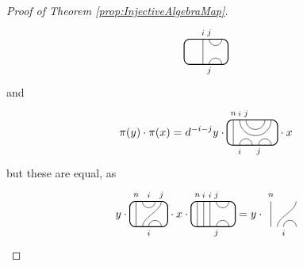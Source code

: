 \documentclass[11pt]{article}
\theoremstyle{plain}
\theoremstyle{definition}
\newcommand{\TLPlusPIso}[3]{
 \TLTStart
 \TLTThrough{#1}
 \TLTSnakeR{#2}{#3}
 \TLTEnd
}
\newcommand{\TLCapJoin}[5]{
 \TLTStart
 \TLTThrough{#1}
 \TLTCapJoin{#2}{#3}{#4}{#5}
 \TLTEnd
}
\newcommand{\TLTCalcLabelOffset}[3][0cm]{
 \settowidth{#2}{\scriptsize{$#3$}}
 \setlength{#2}{.5#2}
 \setlength{#2}{\maxof{#2}{#1}}
}
\newcommand{\TLTEnd}{
 \draw[thick, rounded corners = 5pt] (0,0) rectangle ($ (TLTlead) + (0,.8) $);
 \end{tikzpicture}
}
\newcommand{\TLTStart}{
 \begin{tikzpicture}[baseline=.3cm]
 \coordinate (TLTlead) at (.2,0); %
 \let\TLTlabelwidth\relax
 \newlength{\TLTlabelwidth}
}
\newcommand{\TLTThrough}[1]{
 \TLTCalcLabelOffset[.2cm]{\TLTlabelwidth}{#1}
 \coordinate (TLTlead) at ($ (TLTlead) + ({\TLTlabelwidth},0) $);
 \begin{scope}[shift=(TLTlead)]
  \draw (0,0) -- (0,.8);
  \node at (0,1) {\scriptsize{$#1$}};
 \end{scope}
  \coordinate (TLTlead) at ($ (TLTlead) + ({\TLTlabelwidth},0) $);
}
\newcommand{\TLTCapcup}[1]{
 \TLTCalcLabelOffset[.2cm]{\TLTlabelwidth}{#1}
  \coordinate (TLTlead) at ($ (TLTlead) + ({\TLTlabelwidth},0) $);
 \begin{scope}[shift=(TLTlead)]
  \draw (0,0) arc (180:0:.2);
  \draw (0,.8) arc (-180:0:.2);
  \node at (0,1) {\scriptsize{$#1$}};
 \end{scope}
 \TLTCalcLabelOffset[.5cm]{\TLTlabelwidth}{#1}
 \coordinate (TLTlead) at ($ (TLTlead) + ({\TLTlabelwidth},0)$);
}
\newcommand{\TLTSnakeR}[2]{
 \let\TLTscwidth\relax
 \newlength{\TLTscwidth}
 \let\TLTsswidth\relax
 \newlength{\TLTsswidth}
 \TLTCalcLabelOffset[.2cm]{\TLTscwidth}{#1}
 \TLTCalcLabelOffset[.5cm]{\TLTsswidth}{#2}
 \setlength{\TLTlabelwidth}{\TLTscwidth+\TLTsswidth}
 \setlength{\TLTlabelwidth}{\maxof{\TLTlabelwidth}{.7cm}} %
 \coordinate (TLTlead) at ($ (TLTlead) + ({\TLTscwidth},0) $);
 \begin{scope}[shift=(TLTlead)]
  \draw (.1,.8) arc (-180:0:.2cm);
  \draw (.1,0) .. controls ++(90:.3cm) and ++(270:.3cm) .. ($ (.1,.8) + ({\TLTlabelwidth},0) $);
  \draw ($ (.1,0) + ({\TLTsswidth},0) $) arc (180:0:.2cm);
  \node at (.1,1) {\scriptsize{$#1$}};
  \node at ($ (.1,1) + ({\TLTlabelwidth},0) $) {\scriptsize{$#2$}};
  \node at ($ (.1,-.2) + ({\TLTsswidth},0) $) {\scriptsize{$#1$}};
 \end{scope}
 \coordinate (TLTlead) at ($ (TLTlead) + ({\TLTlabelwidth+\TLTsswidth},0) $);
}
\newcommand{\TLTCapJoin}[4]{
 \let\TLTjoinlwidth\relax
 \newlength{\TLTjoinlwidth}
 \let\TLTjoinrwidth\relax
 \newlength{\TLTjoinrwidth}
 \let\TLTsplitlwidth\relax
 \newlength{\TLTsplitlwidth}
 \let\TLTsplitrwidth\relax
 \newlength{\TLTsplitrwidth}
 \TLTCalcLabelOffset[.8cm]{\TLTjoinrwidth}{#4} %
 \TLTCalcLabelOffset[.15cm]{\TLTjoinlwidth}{#3} %
 \TLTCalcLabelOffset[.6cm]{\TLTsplitlwidth}{#1}
 \TLTCalcLabelOffset[.6cm]{\TLTsplitrwidth}{#2}
 \setlength{\TLTlabelwidth}{\maxof{\TLTjoinlwidth}{\TLTsplitlwidth}}
 \coordinate (TLTlead) at ($ (TLTlead) + ({\TLTlabelwidth},0) $);
 \setlength{\TLTlabelwidth}{\maxof{\TLTjoinrwidth}{\TLTsplitrwidth}} %
 \begin{scope}[shift=(TLTlead)]
  \draw (0,.8) arc (-180:0:.5);
  \draw (0.2,.8) arc (-180:0:.3);
  \draw (0,0) arc (180:0:.2);
  \draw ({\TLTsplitlwidth},0) arc (180:0:.2);
  \node at (0,1) {\scriptsize{$#4$}};
  \node at ({\TLTjoinlwidth},1) {\scriptsize{$#3$}};
  \node at (0,-.2) {\scriptsize{$#1$}};
  \node at ({\TLTsplitlwidth},-.2) {\scriptsize{$#2$}};
 \end{scope}
 \coordinate (TLTlead) at ($ (TLTlead) + ({\TLTlabelwidth},0) $);
}
\begin{document}
\begin{proof}[Proof of Theorem \ref{prop:InjectiveAlgebraMap}]
$$\begin{tikzpicture}[baseline=.3cm]
  \draw (.6,0) -- (.6,.8);
  \node at (.6,1) {\scriptsize{$i$}};
  \draw (.8,0) arc (180:0:.2cm);
  \node at (.8,-.2) {\scriptsize{$j$}};
  \draw (.8,.8) arc (-180:0:.2cm);
  \node at (.8,1) {\scriptsize{$j$}};
  \draw[thick, rounded corners = 5pt] (0,0) rectangle (1.4,.8);
 \end{tikzpicture}
$$
and
$$
\pi(y)\cdot \pi(x) = d^{-i-j}y\cdot
 \begin{tikzpicture}[baseline=.3cm]
  \draw (.2,0) -- (.2,.8);
  \node at (.2,1) {\scriptsize{$n$}};
  \draw (.4,0) arc (180:0:.2cm);
  \node at (.4,-.2) {\scriptsize{$i$}};
  \draw (1,0) arc (180:0:.2cm);
  \node at (1,-.2) {\scriptsize{$j$}};
  \draw (.4,.8) arc (-180:0:.5cm);
  \node at (.4,1) {\scriptsize{$i$}};
  \draw (.6,.8) arc (-180:0:.3cm);
  \node at (.6,1) {\scriptsize{$j$}};
  \draw[thick, rounded corners = 5pt] (0,0) rectangle (1.6,.8);
 \end{tikzpicture}
\cdot x
$$
but these are equal, as
\begin{equation*}
 y\cdot
 \begin{tikzpicture}[baseline=.3cm]
  \draw (.2,0) -- (.2,.8);
  \node at (.2,1) {\scriptsize{$n$}};
  \draw (.6,0) arc (180:0:.2cm);
  \node at (.6,-.2) {\scriptsize{$i$}};
  \draw (.4,0) .. controls ++(90:.3cm) and ++(270:.3cm) .. (1,.8);
  \node at (1,1) {\scriptsize{$j$}};
  \draw (.4,.8) arc (-180:0:.2cm);
  \node at (.6,1) {\scriptsize{$i$}};
  \draw[thick, rounded corners = 5pt] (0,0) rectangle (1.2,.8);
 \end{tikzpicture}
\cdot x \cdot
 \begin{tikzpicture}[baseline=.3cm]
  \draw (.2,0) -- (.2,.8);
  \node at (.2,1) {\scriptsize{$n$}};
  \draw (.4,0) -- (.4,.8);
  \node at (.4,1) {\scriptsize{$i$}};
  \draw (.6,0) -- (.6,.8);
  \node at (.6,1) {\scriptsize{$i$}};
  \draw (.8,0) arc (180:0:.2cm);
  \node at (.8,-.2) {\scriptsize{$j$}};
  \draw (.8,.8) arc (-180:0:.2cm);
  \node at (.8,1) {\scriptsize{$j$}};
  \draw[thick, rounded corners = 5pt] (0,0) rectangle (1.4,.8);
 \end{tikzpicture}
= y\cdot
 \begin{tikzpicture}[baseline=.3cm]
  \draw (.2,0) -- (.2,.8);
  \node at (.2,1) {\scriptsize{$n$}};
  \draw (.6,0) arc (180:0:.2cm);
  \node at (.6,-.2) {\scriptsize{$i$}};
  \draw (.4,0) .. controls ++(90:.3cm) and ++(270:.3cm) .. (1,.8);

\end{tikzpicture}
\end{equation*}
\end{proof}
\end{document}
